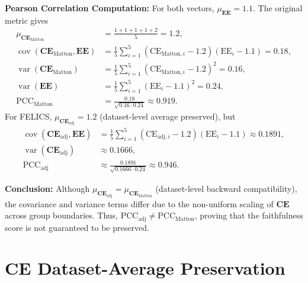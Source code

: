 \begin{example_box}[label=ex:payout_normalization_correlation]
	\smallskip
	\textbf{Pearson Correlation Computation:} For both vectors, $\mu_{\mathbf{EE}} = 1.1$. The original metric gives
	\begin{align*}
		\mu_{\mathbf{CE}_{\mathrm{Matton}}}                            & = \frac{1+1+1+1+2}{5} = 1.2,                                                                   \\
		\operatorname{cov}(\mathbf{CE}_{\mathrm{Matton}}, \mathbf{EE}) & = \frac{1}{5}\sum_{i=1}^5 (\mathrm{CE}_{\mathrm{Matton},i} - 1.2)(\mathrm{EE}_i - 1.1) = 0.18, \\
		\operatorname{var}(\mathbf{CE}_{\mathrm{Matton}})              & = \frac{1}{5}\sum_{i=1}^5 (\mathrm{CE}_{\mathrm{Matton},i} - 1.2)^2 = 0.16,                    \\
		\operatorname{var}(\mathbf{EE})                                & = \frac{1}{5}\sum_{i=1}^5 (\mathrm{EE}_i - 1.1)^2 = 0.24,                                      \\
		\mathrm{PCC}_{\mathrm{Matton}}                                 & = \frac{0.18}{\sqrt{0.16 \cdot 0.24}} \approx 0.919.
	\end{align*}
	For FELICS, $\mu_{\mathbf{CE}_{\text{adj}}} = 1.2$ (dataset-level average preserved), but
	\begin{align*}
		\operatorname{cov}(\mathbf{CE}_{\text{adj}}, \mathbf{EE}) & = \frac{1}{5}\sum_{i=1}^5 (\mathrm{CE}_{\text{adj},i} - 1.2)(\mathrm{EE}_i - 1.1) \approx 0.1891, \\
		\operatorname{var}(\mathbf{CE}_{\text{adj}})              & \approx 0.1666,                                                                                   \\
		\mathrm{PCC}_{\mathrm{adj}}                               & \approx \frac{0.1891}{\sqrt{0.1666 \cdot 0.24}} \approx 0.946.
	\end{align*}

	\smallskip
	\textbf{Conclusion:} Although $\mu_{\mathbf{CE}_{\text{adj}}} = \mu_{\mathbf{CE}_{\mathrm{Matton}}}$ (dataset-level backward compatibility), the covariance and variance terms differ due to the non-uniform scaling of $\mathbf{CE}$ across group boundaries. Thus, $\mathrm{PCC}_{\mathrm{adj}} \neq \mathrm{PCC}_{\mathrm{Matton}}$, proving that the faithfulness score is not guaranteed to be preserved.
\end{example_box}

\section{CE Dataset-Average Preservation}
\label{app:dataset_average_preservation}

